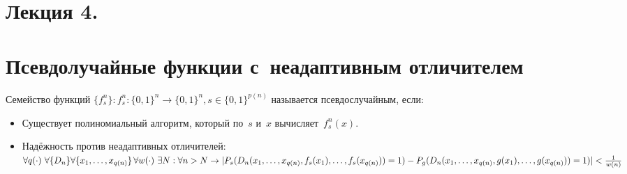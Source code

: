 \documentclass{article}
\begin{document}
\section*{Лекция 4. }
\resetcntrs

\section{Псевдолучайные функции с~неадаптивным отличителем}

\begin{definition}
	Семейство функций $\{f_s^n\}: f_s^n: \{0, 1\}^n \rightarrow \{0, 1\}^n, s \in
	\{0, 1\}^{p(n)}$ называется псевдослучайным, если:
	\begin{itemize}
		\item Существует полиномиальный алгоритм, который по~$s$ и~$x$
			вычисляет~$f_s^n(x)$.
		\item Надёжность против неадаптивных отличителей:\\
			$\forall q(\cdot)\ \forall\{D_n\} \forall\{x_1, \ldots, x_{q(n)}\}\,
			\forall w(\cdot)\ \exists N: \forall n > N \rightarrow\\
			|P_s(D_n(x_1, \ldots, x_{q(n)}, f_s(x_1), \ldots, f_s(x_{q(n)})) = 1) -\\
			P_g(D_n(x_1, \ldots, x_{q(n)}, g(x_1), \ldots, g(x_{q(n)})) = 1)| <
			\frac{1}{w(n)}$
	\end{itemize}
\end{definition}
\end{document}
